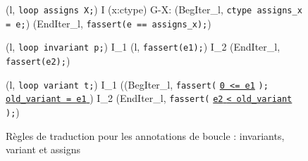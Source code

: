 \begin{figure*}[bt]
  \scriptsize{
    {
      {
        \splitfrac
            {
              (l, \mbox{\lstinline'loop assigns X;'}) 
            }
            {
              I \concat
              \forall (x:ctype) \in G-X:
              (BegIter_l, \mbox{\lstinline'ctype assigns_x = e;'})
              \concat (EndIter_l, \mbox{\lstinline'fassert(e == assigns_x);'})
            }
      }
    }

    {
      {
        (l, \mbox{\lstinline'loop invariant p;'}) 
        I_1 \concat (l, \mbox{\lstinline'fassert(e1);'})
        \concat I_2 \concat (EndIter_l, \mbox{\lstinline'fassert(e2);'})
      }
    }

    {
      {
        \splitfrac
            {
              (l, \mbox{\lstinline'loop variant t;'}) 
            }
            {
              I_1 \concat ((BegIter_l,
              \mbox{\lstinline'fassert('}
              \underline{\mbox{\lstinline'0 <= e1'}}
              \mbox{\lstinline');' }
              \underline{\Zinit \mbox{\lstinline'old_variant = e1'} \Zclear}
              \semicolon)
              \concat I_2
              \concat(EndIter_l,
              \mbox{\lstinline'fassert('}
              \underline{\mbox{\lstinline'e2'}\Zclear
                \mbox{\lstinline'< old_variant'} \Zclear}
              \mbox{\lstinline');'})
            }
      }
    }
  }
  \caption{Règles de traduction pour les annotations de boucle : invariants,
    variant et assigns}
  \label{fig:loop-annot}
\end{figure*}


